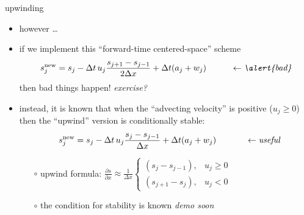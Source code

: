 \documentclass[10pt,dvipsnames]{beamer}
\newcommand{\snew}{s^{\text{new}}}
\newcommand{\comm}[1]{{\footnotesize \hfill \emph{#1}}}
\begin{document}
\begin{frame}{upwinding}

\begin{itemize}
\item \alert{however \dots}
\item if we implement this ``forward-time centered-space'' scheme
	$$\snew_j = s_j - \Delta t\, u_j \frac{s_{j+1}-s_{j-1}}{2\Delta x} + \Delta t (a_j + w_j) \hspace{1.0cm} \leftarrow \text{\emph{\alert{bad}}}$$
then bad things happen! \comm{exercise?}
\item instead, it is known that when the ``advecting velocity'' is positive ($u_j \ge 0$) then the ``upwind'' version is conditionally stable:
	$$\hspace{3mm} \snew_j = s_j - \Delta t\, u_j \frac{s_j-s_{j-1}}{\Delta x} + \Delta t (a_j + w_j) \hfill \hspace{1.2cm} \leftarrow \text{\emph{useful}}$$

    \begin{itemize}
    \item[$\circ$] upwind formula: \quad $\displaystyle \frac{\partial s}{\partial x} \approx \frac{1}{\Delta x} \begin{cases} (s_j-s_{j-1}), & u_j \ge 0 \\ (s_{j+1}-s_j), & u_j < 0 \end{cases}$
    \item[$\circ$] the condition for stability is known \comm{demo soon}
    \end{itemize}
\end{itemize}
\end{frame}
\end{document}
